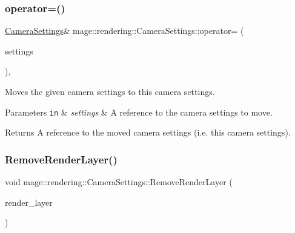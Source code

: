 \subsubsection{\texorpdfstring{operator=()}{operator=()}\hspace{0.1cm}{\footnotesize\ttfamily [2/2]}}
{\footnotesize\ttfamily \mbox{\hyperlink{classmage_1_1rendering_1_1_camera_settings}{Camera\+Settings}}\& mage\+::rendering\+::\+Camera\+Settings\+::operator= (\begin{DoxyParamCaption}\item[{\mbox{\hyperlink{classmage_1_1rendering_1_1_camera_settings}{Camera\+Settings}} \&\&}]{settings }\end{DoxyParamCaption})\hspace{0.3cm}{\ttfamily [default]}, {\ttfamily [noexcept]}}

Moves the given camera settings to this camera settings.


\begin{DoxyParams}[1]{Parameters}
\mbox{\tt in}  & {\em settings} & A reference to the camera settings to move. \\
\hline
\end{DoxyParams}
\begin{DoxyReturn}{Returns}
A reference to the moved camera settings (i.\+e. this camera settings). 
\end{DoxyReturn}
\mbox{\label{classmage_1_1rendering_1_1_camera_settings_a49c766f4880c798a90a9b8fe488a6711}} 
\subsubsection{\texorpdfstring{Remove\+Render\+Layer()}{RemoveRenderLayer()}}
{\footnotesize\ttfamily void mage\+::rendering\+::\+Camera\+Settings\+::\+Remove\+Render\+Layer (\begin{DoxyParamCaption}\item[{\mbox{\hyperlink{namespacemage_1_1rendering_a466c2a441ea5b26e4625c2f34e021b3d}{Render\+Layer}}}]{render\+\_\+layer }\end{DoxyParamCaption})\hspace{0.3cm}{\ttfamily [noexcept]}}

